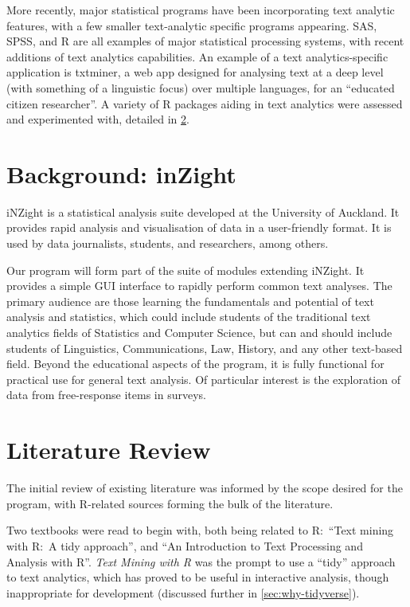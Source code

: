 \message{ !name(jason-cairns-dissertation.tex)}\documentclass[11pt, a4paper, titlepage]{report}
\begin{document}
More recently, major statistical programs have been incorporating text
analytic features, with a few smaller text-analytic specific programs
appearing. SAS\autocite{inc.19:_sas_text_miner},
SPSS\autocite{corp.17:_ibm_spss_statis_window_version}, and
R\autocite{team19:_r} are all examples of major statistical processing
systems, with recent additions of text analytics capabilities. An
example of a text analytics-specific application is txtminer, a web
app designed for analysing text at a deep level (with something of a
linguistic focus) over multiple languages, for an ``educated citizen
researcher''\autocite{bnosac19:_autom_text_analy}. A variety of R
packages aiding in text analytics were assessed and experimented with,
detailed in \cref{sec:liter-revi-exist}.

\section{Background: inZight}\label{sec:background:-inzight}

iNZight is a statistical analysis suite developed at the University of
Auckland\autocite{wild:_data_analy}. It provides rapid analysis and
visualisation of data in a user-friendly format. It is used by data
journalists, students, and researchers, among others.

Our program will form part of the suite of modules extending iNZight.
It provides a simple GUI interface to rapidly perform common text
analyses. The primary audience are those learning the fundamentals and
potential of text analysis and statistics, which could include
students of the traditional text analytics fields of Statistics and
Computer Science, but can and should include students of Linguistics,
Communications, Law, History, and any other text-based field. Beyond
the educational aspects of the program, it is fully functional for
practical use for general text analysis. Of particular interest is the
exploration of data from free-response items in surveys.

\section{Literature Review}\label{sec:liter-revi-exist}

The initial review of existing literature was informed by the scope
desired for the program, with R-related sources forming the bulk of
the literature.

Two textbooks were read to begin with, both being related to R:\
``Text mining with R:~A tidy approach''\autocite{silge2017text}, and
``An Introduction to Text Processing and Analysis with
R''\autocite{clark2019text}. \textit{Text Mining with R} was the
prompt to use a ``tidy'' approach to text analytics, which has proved
to be useful in interactive analysis, though inappropriate for
development (discussed further in \cref{sec:why-tidyverse}).
\end{document}
